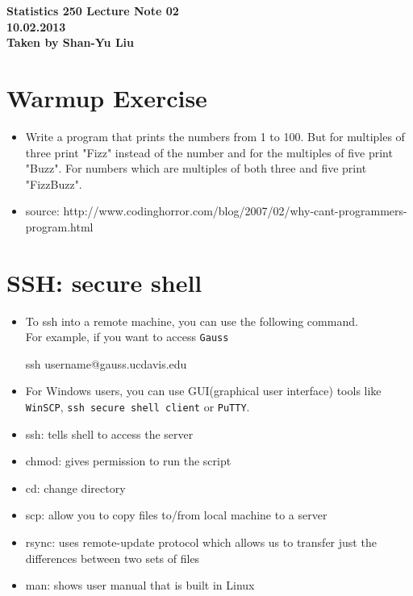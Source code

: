 \documentclass[10pt]{article}
\begin{document}
\begin{center}
{ \LARGE \bfseries Statistics 250 Lecture Note 02 }\\[0.4cm]
\textsc{\Large\bfseries 10.02.2013}\\[0.5cm]
{\Large\bfseries Taken by Shan-Yu Liu}
\end{center}

\section{Warmup Exercise}
\begin{itemize}
\item Write a program that prints the numbers from 1 to 100. But for multiples of three print "Fizz" instead of the number and for the multiples of five print "Buzz". For numbers which are multiples of both three and five print "FizzBuzz".
\item source: http://www.codinghorror.com/blog/2007/02/why-cant-programmers-program.html
\end{itemize}    

\section{SSH: secure shell}
\begin{itemize}
\item To ssh into a remote machine, you can use the following command. \\
  For example, if you want to access \verb"Gauss"\\
  \begin{center}
  \textsf{ssh username@gauss.ucdavis.edu}
  \end{center}
  
\item For Windows users, you can use GUI(graphical user interface) tools like \verb"WinSCP", \verb"ssh secure shell client" or \verb"PuTTY".
    
\item \textsf{ssh}: tells shell to access the server
\item \textsf{chmod}: gives permission to run the script
\item \textsf{cd}: change directory
\item \textsf{scp}: allow you to copy files to/from local machine to a server 
\item \textsf{rsync}: uses remote-update protocol which allows us to transfer just the differences between two sets of files
\item \textsf{man}: shows user manual that is built in Linux    
\end{itemize} 
\end{document}
